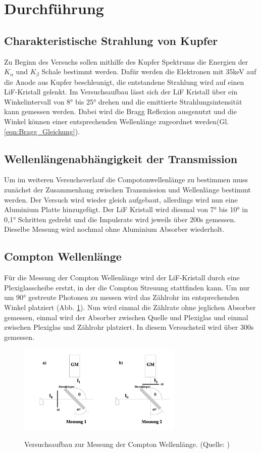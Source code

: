 \section{Durchführung}
\label{sec:Durchfuehrung}
\subsection{Charakteristische Strahlung von Kupfer}
Zu Beginn des Versuchs sollen mithilfe des Kupfer Spektrums die Energien der $K_{\alpha}$ und $K_{\beta}$ Schale bestimmt werden.
Dafür werden die Elektronen mit 35keV auf die Anode aus Kupfer beschleunigt, die entstandene Strahlung wird auf einen LiF-Kristall gelenkt.
Im Versuchsaufbau lässt sich der LiF Kristall über ein Winkelintervall von 8° bis 25° drehen und die emittierte Strahlungsintensität kann gemessen werden.
Dabei wird die Bragg Reflexion ausgenutzt und die Winkel können einer entsprechenden Wellenlänge zugeordnet werden(Gl. \ref{eqn:Bragg_Gleichung}).

\subsection{Wellenlängenabhängigkeit der Transmission}
Um im weiteren Versuchsverlauf die Compotonwellenlänge zu bestimmen muss zunächst der Zusammenhang zwischen Transmission und Wellenlänge bestimmt werden.
Der Versuch wird wieder gleich aufgebaut, allerdings wird nun eine Aluminium Platte hinzugefügt.
Der LiF Kristall wird diesmal von 7° bis 10° in 0,1° Schritten gedreht und die Impulsrate wird jeweils über 200s gemessen.
Dieselbe Messung wird nochmal ohne Aluminium Absorber wiederholt.

\subsection{Compton Wellenlänge}
Für die Messung der Compton Wellenlänge wird der LiF-Kristall durch eine Plexiglasscheibe erstzt, in der die Compton Streuung stattfinden kann. Um nur um 90° gestreute Photonen zu messen wird das Zählrohr im entsprechenden Winkel platziert (Abb. \ref{fig:Exp_Aufbau_2}).
Nun wird einmal die Zählrate ohne jeglichen Absorber gemessen, einmal wird der Absorber zwischen Quelle und Plexiglas und einmal zwischen Plexiglas und Zählrohr platziert.
In diesem Versuchsteil wird über 300s gemessen.
\begin{figure}
    \centering
    \includegraphics[width=0.7\textwidth]{bilder/Exp_Aufbau_2.png}
    \label{fig:Exp_Aufbau_2}
    \caption{Versuchsaufbau zur Messung der Compton Wellenlänge. (Quelle: \cite{Anleitung})}
\end{figure}
